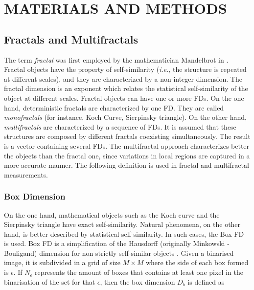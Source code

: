 \documentclass[a4paper,10pt]{article}
\begin{document}



\section{MATERIALS AND METHODS}
\subsection{Fractals and Multifractals}

The term {\em fractal} was first employed by the mathematician Mandelbrot in \cite{Mandelbrot83}. Fractal objects have the property of self-similarity ({\em i.e.}, the structure is repeated at different scales), and they are characterized by a non-integer dimension. The fractal dimension is an exponent which relates the statistical self-similarity of the object at different scales. Fractal objects can have one or more FDs. On the one hand, deterministic fractals are characterized by one FD. They are called {\em monofractals} (for instance, Koch Curve, Sierpinsky triangle). On the other hand, {\em multifractals} \cite{Mandelbrot89} are characterized by a sequence of FDs. It is assumed that these structures are composed by different fractals coexisting simultaneously. The result is a vector containing several FDs. The multifractal approach characterizes better the objects than the fractal one, since variations in local regions are captured in a more accurate manner. The following definition is used in fractal and multifractal measurements.

\subsubsection{Box Dimension}
On the one hand, mathematical objects such as the Koch curve and the Sierpinsky triangle have exact self-similarity. Natural phenomena, on the other hand, is better described by statistical self-similarity. In such cases, the Box FD is used. Box FD is a simplification of the Hausdorff (originally Minkowski - Bouligand) dimension for non strictly self-similar objects \cite{Peitgen2004}. Given a binarised image, it is subdivided in a grid of size $M\times M$ where the side of each box formed is $\epsilon$. If $N_{\epsilon}$ represents the amount of boxes that contains at least one pixel in the binarisation of the set for that $\epsilon$, then the box dimension  $D_{b}$ is defined as
\end{document}
